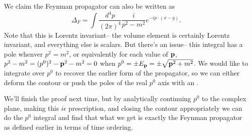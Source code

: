 We claim the Feynman propagator can also be written as
$$\Delta_F =\int \frac{d^4p}{(2\pi)^4}\frac{i}{p^2-m^2}e^{-ip\cdot (x-y)}.$$
Note that this is Lorentz invariant-- the volume element is certainly Lorentz invariant, and everything else is scalars. But there's an issue-- this integral has a pole whenver $p^2=m^2$, or equivalently for each value of $\boldsymbol{\mathbf{p}}$, $p^2-m^2=(p^0)^2-\boldsymbol{\mathbf{p}}^2-m^2=0$ when $p^0= \pm E_{\boldsymbol{\mathbf{p}}}=\pm \sqrt{ \boldsymbol{\mathbf{p}}^2+m^2}$. We would like to integrate over $p^0$ to recover the earlier form of the propagator, so we can either deform the contour or push the poles of the real $p^0$ axis with an .

We'll finish the proof next time, but by analytically continuing $p^0$ to the complex plane, making this $i\epsilon$ prescription, and closing the contour appropriately we can do the $p^0$ integral and find that what we get is exactly the Feynman propagator as defined earlier in terms of time ordering.

